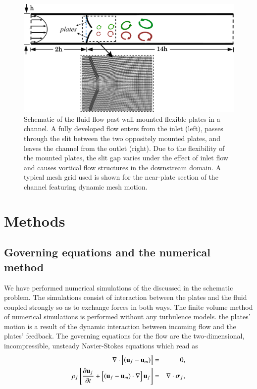 \documentclass[final,3p,10pt,times,review,authoryear]{elsarticle}
\begin{document}
	\begin{figure}[h]
		\centering
		\begin{minipage}[c]{0.95\linewidth}
			
			\includegraphics[width=1\linewidth]{Figures/Schematic-01.png} 
			
		\end{minipage} 		
		\caption{Schematic of the fluid flow past wall-mounted flexible plates in a channel. A fully developed flow enters from the inlet (left), passes through the slit between the two oppositely mounted plates, and leaves the channel from the outlet (right). Due to the flexibility of the mounted plates, the slit gap varies under the effect of inlet flow and causes vortical flow structures in the downstream domain. A typical mesh grid used is shown for the near-plate section of the channel featuring dynamic mesh motion.}	
		\label{fig:schematic}
	\end{figure}
	
	
	\section{Methods}\label{sec:maths}
	\subsection{Governing equations and the numerical method}\label{subsec:maths}
	We have performed numerical simulations of the discussed in the schematic problem. The simulations consist of interaction between the plates and the fluid coupled strongly so as to exchange forces in both ways. The finite volume method of numerical simulations is performed without any turbulence models. the plates' motion is a result of the dynamic interaction between incoming flow and the plates' feedback. The governing equations for the flow are the two-dimensional, incompressible, unsteady Navier-Stokes equations which read as
	\begin{eqnarray}
		\nabla\cdot\left[(\mathbf{u}_f-\mathbf{u}_m)\right] &=& 0, \\
		\rho_f\left[{\partial\mathbf{u}_f\over\partial t}+\left[(\mathbf{u}_f-\mathbf{u}_m)\cdot\mathbf{\nabla}\right]\mathbf{u}_f\right] &=& \mathbf{\nabla}\cdot\mathbf{\boldsymbol{\sigma}}_f,
	\end{eqnarray}
	
\end{document}
